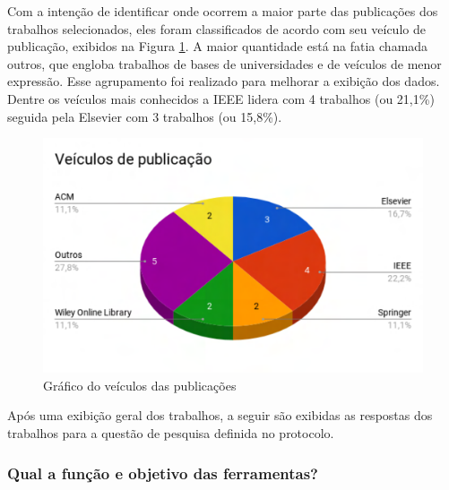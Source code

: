 Com a intenção de identificar onde ocorrem a maior parte das publicações dos trabalhos selecionados, eles foram classificados de acordo com seu veículo de publicação, exibidos na Figura \ref{fig:veiculo}. A maior quantidade está na fatia chamada outros, que engloba trabalhos de bases de universidades e de veículos de menor expressão. Esse agrupamento foi realizado para melhorar a exibição dos dados. Dentre os veículos mais conhecidos a IEEE lidera com 4 trabalhos (ou 21,1\%) seguida pela Elsevier com 3 trabalhos (ou 15,8\%).

\begin{figure}[!htb]
	\caption{Gráfico do veículos das publicações}\label{fig:veiculo}
	\begin{center}
		\includegraphics[scale=0.4]{img/GrafVeiculo}
	\end{center}
\end{figure}

Após uma exibição geral dos trabalhos, a seguir são exibidas as respostas dos trabalhos para a questão de pesquisa definida no protocolo.
\subsubsection{Qual a função e objetivo das ferramentas?}\label{subsub:trabalhosRelacionados_resultados_questao1}

